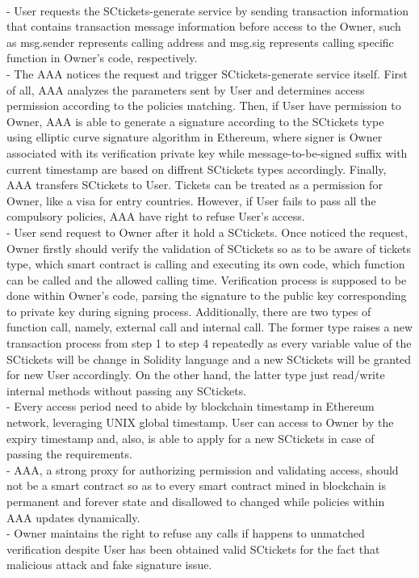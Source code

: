 \\  - User requests the SCtickets-generate service by sending transaction information that contains transaction message information before access to the Owner, such as msg.sender represents calling address and msg.sig represents calling specific function in Owner’s code, respectively.
\\ - The AAA notices the request and trigger SCtickets-generate service itself. First of all, AAA analyzes the parameters sent by User and determines access permission according to the policies matching. Then, if User have permission to Owner, AAA is able to generate a signature according to the SCtickets type using elliptic curve signature algorithm in Ethereum, where signer is Owner associated with its verification private key while message-to-be-signed suffix with current timestamp are based on diffrent SCtickets types accordingly. Finally, AAA transfers SCtickets to User. Tickets can be treated as a permission for Owner, like a visa for entry countries. However, if User fails to pass all the compulsory policies, AAA have right to refuse User’s access.
\\ - User send request to Owner after it hold a SCtickets. Once noticed the request, Owner firstly should verify the validation of SCtickets so as to be aware of tickets type, which smart contract is calling and executing its own code, which function can be called and the allowed calling time. Verification process is supposed to be done within Owner's code, parsing the signature to the public key corresponding to private key during signing process. Additionally, there are two types of function call, namely, external call and internal call. The former type raises a new transaction process from step 1 to step 4 repeatedly as every variable value of the SCtickets will be change in Solidity language and a new SCtickets will be granted for new User accordingly. On the other hand, the latter type just read/write internal methods without passing any SCtickets.
\\ - Every access period need to abide by blockchain timestamp in Ethereum network, leveraging UNIX global timestamp.  User can access to Owner by the expiry timestamp and, also, is able to apply for a new SCtickets in case of passing the requirements.
\\ - AAA, a strong proxy for authorizing permission and validating access, should not be a smart contract so as to every smart contract mined in blockchain is permanent and forever state and disallowed to changed while policies within AAA updates dynamically.
\\ - Owner maintains the right to refuse any calls if happens to unmatched verification despite User has been obtained valid SCtickets for the fact that malicious attack and fake signature issue.